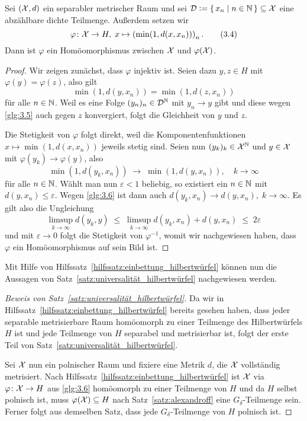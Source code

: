\documentclass[../thesis/thesis.tex]{subfiles}
\begin{document}
	\begin{Hilfssatz}
		\label{hilfssatz:einbettung_hilbertwürfel}
		Sei $(\mathcal{X}, d)$ ein separabler metrischer Raum und sei 
		$\mathcal{D} \vcentcolon = \left\{\, x_n \; \middle| \; n \in \mathbb{N} \,\right\} \subseteq \mathcal{X}$ eine abzählbare 
		dichte Teilmenge. Außerdem setzen wir
		\[\varphi \colon \mathcal{X} \to H, \; x \mapsto \left(\min (1, d(x, x_n)) \right)_n  \text{.} \label{glg:3.4} \tag{3.4}\]
		Dann ist $\varphi$ ein Homöomorphismus zwischen $\mathcal{X}$ und $\varphi(\mathcal{X})$.
	\end{Hilfssatz}
	
	\begin{proof}
		Wir zeigen zunächst, dass $\varphi$ injektiv ist. 
		Seien dazu $y, z \in H$ mit $\varphi(y) = \varphi(z)$, also gilt
		\[\min (1, d(y, x_n)) = \min (1, d(z, x_n)) \label{glg:3.5} \tag{3.5}\]
		für alle $n \in \mathbb{N}$. Weil es eine Folge $(y_n)_n \in \mathcal{D}^{\mathbb{N}}$ mit 
		$y_n \to y$ gibt und diese wegen \eqref{glg:3.5} auch gegen $z$ 
		konvergiert, folgt die Gleichheit von $y$ und $z$.
		
		Die Stetigkeit von $\varphi$ folgt direkt, weil die 
		Komponentenfunktionen $x \mapsto \min (1, d(x, x_n))$ jeweils stetig sind. 
		Seien nun $(y_k)_k \in \mathcal{X}^{\mathbb{N}}$ und $y \in \mathcal{X}$ mit $\varphi(y_k) \to \varphi(y)$, 
		also
		\[\min (1, d(y_k, x_n)) \; \to \; \min (1, d(y, x_n)), 
		\quad k \to \infty \label{glg:3.6} \tag{3.6}\]
		für alle $n \in \mathbb{N}$. Wählt man nun $\varepsilon < 1$ beliebig, 
		so existiert ein $n \in \mathbb{N}$ mit $d(y, x_n) \leq \varepsilon$. 
		Wegen \eqref{glg:3.6} ist dann auch
		$d(y_k, x_n) \to d(y, x_n), \; k \to \infty$. Es gilt also die Ungleichung
		$$\limsup_{k \to \infty} d(y_k, y) \; \leq \; 
		\limsup_{k \to \infty} d(y_k, x_n) + d(y, x_n) \; \leq \; 2\varepsilon$$
		und mit $\varepsilon \to 0$ folgt die Stetigkeit von $\varphi^{-1}$, 
		womit wir nachgewiesen haben, dass $\varphi$ ein Homöomorphismus auf sein Bild ist. 
	\end{proof}

	Mit Hilfe von Hilfssatz~\ref{hilfssatz:einbettung_hilbertwürfel} können nun die Aussagen von
	Satz~\ref{satz:universalität_hilbertwürfel} nachgewiesen werden.
	
	\begin{proof}[Beweis von Satz~\ref{satz:universalität_hilbertwürfel}]
		Da wir in Hilfssatz~\ref{hilfssatz:einbettung_hilbertwürfel} bereits 
		gesehen haben, dass jeder separable metrisierbare Raum homöomorph zu einer 
		Teilmenge des Hilbertwürfels $H$ ist und jede Teilmenge von $H$ separabel und metrisierbar ist,
		folgt der erste Teil von Satz~\ref{satz:universalität_hilbertwürfel}. 
		
		Sei $\mathcal{X}$ nun ein polnischer Raum und fixiere eine Metrik $d$, die $\mathcal{X}$ vollständig metrisiert. 
		Nach Hilfssatz~\ref{hilfssatz:einbettung_hilbertwürfel} ist $\mathcal{X}$ via $\varphi \colon \mathcal{X} \to H$ aus \eqref{glg:3.6}
		homöomorph zu einer Teilmenge von $H$ und da $H$ selbst polnisch ist, muss $\varphi(\mathcal{X}) \subseteq H$ nach 
		Satz~\ref{satz:alexandroff} eine $G_\delta$-Teilmenge sein.
		Ferner folgt aus demselben Satz, dass jede $G_\delta$-Teilmenge von $H$ polnisch ist.
	\end{proof}
\end{document}
